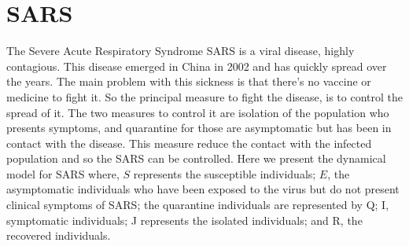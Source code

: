 \section{SARS}

    The Severe Acute Respiratory Syndrome SARS is a viral disease, highly 
    contagious. This disease emerged in China in 2002 and has quickly spread
    over the years. The main problem with this sickness is that there's no 
    vaccine or  medicine to fight it. So the principal measure to fight the
    disease, is to control the spread of it. The two measures to control it are
    isolation of the population who presents symptoms, and quarantine for those
    are asymptomatic but has been in contact with the disease. This measure 
    reduce the contact with the infected population and so the SARS can be 
    controlled. Here we present the dynamical model for SARS where, $S$ 
    represents the susceptible individuals; $E$, the asymptomatic individuals 
    who have been exposed to the virus but do not present clinical symptoms 
    of SARS; the quarantine individuals are represented by Q; I, symptomatic 
    individuals; J represents the isolated individuals; and R, the recovered
    individuals. 
    
